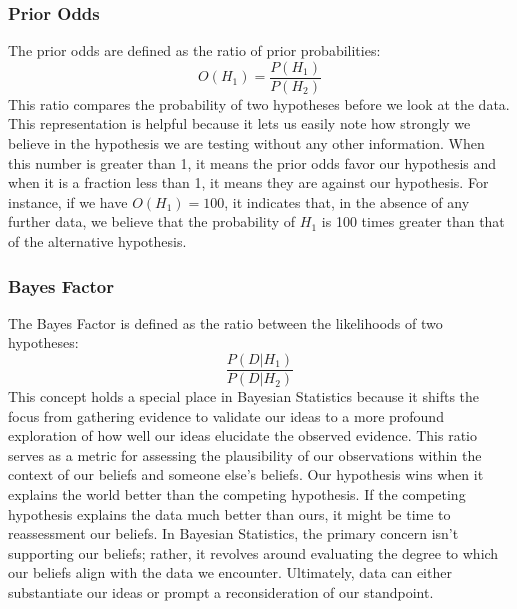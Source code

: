 \documentclass{article}
\begin{document}
\subsubsection{Prior Odds}
The prior odds are defined as the ratio of prior probabilities:
\[O(H_1)=\frac{P(H_1)}{P(H_2)}\]
This ratio compares the probability of two hypotheses before we look at the data. This representation is helpful because it lets us easily note how strongly we believe in the hypothesis we are testing without any other information. When this number is greater than 1, it means the prior odds favor our hypothesis and when it is a fraction less than 1, it means they are against our hypothesis. For instance, if we have $O(H_1)=100$, it indicates that, in the absence of any further data, we believe that the probability of $H_1$ is 100 times greater than that of the alternative hypothesis.
\subsubsection{Bayes Factor}
The Bayes Factor is defined as the ratio between the likelihoods of two hypotheses:
\[\frac{P(D|H_1)}{P(D|H_2)}\]
This concept holds a special place in Bayesian Statistics because it shifts the focus from gathering evidence to validate our ideas to a more profound exploration of how well our ideas elucidate the observed evidence. This ratio serves as a metric for assessing the plausibility of our observations within the context of our beliefs and someone else's beliefs. Our hypothesis wins when it explains the world better than the competing hypothesis. If the competing hypothesis explains the data much better than ours, it might be time to reassessment our beliefs. In Bayesian Statistics, the primary concern isn't supporting our beliefs; rather, it revolves around evaluating the degree to which our beliefs align with the data we encounter. Ultimately, data can either substantiate our ideas or prompt a reconsideration of our standpoint.
\end{document}
